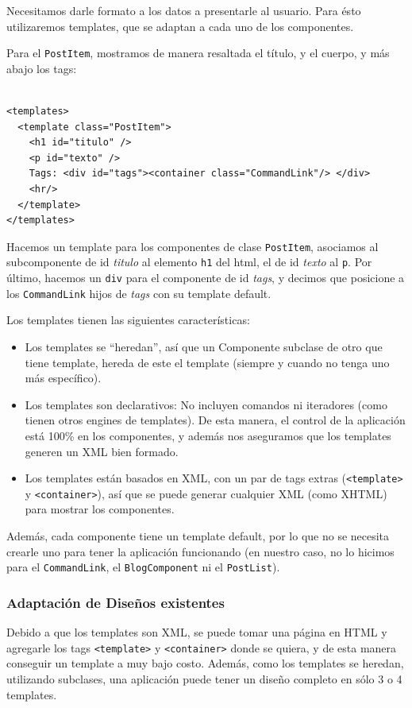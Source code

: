Necesitamos darle formato a los datos a presentarle al usuario. Para ésto utilizaremos templates, que se adaptan a cada uno de los componentes.

Para el \verb'PostItem', mostramos de manera resaltada el título, y el cuerpo, y más abajo los tags:

\begin{verbatim}

<templates>
  <template class="PostItem">
    <h1 id="titulo" />
    <p id="texto" />
    Tags: <div id="tags"><container class="CommandLink"/> </div>
    <hr/>
  </template>
</templates>

\end{verbatim}

Hacemos un template para los componentes de clase \verb'PostItem', asociamos al subcomponente de id \emph{titulo} al elemento \verb'h1' del html, el de id \emph{texto} al \verb'p'. Por último, hacemos un \verb'div' para el componente de id \emph{tags}, y decimos que posicione a los \verb'CommandLink' hijos de \emph{tags} con su template default.

Los templates tienen las siguientes características:
\begin{itemize}
\item Los templates se ``heredan'', así que un Componente subclase de otro que tiene template, hereda de este el template (siempre y cuando no tenga uno más específico).

\item Los templates son declarativos: No incluyen comandos ni iteradores (como tienen otros engines de templates). De esta manera, el control de la aplicación está 100\% en los componentes, y además nos aseguramos que los templates generen un XML bien formado.

\item Los templates están basados en XML, con un par de tags extras (\verb"<template>" y \verb"<container>"), así que se puede generar cualquier XML (como XHTML) para mostrar los componentes.
\end{itemize}

Además, cada componente tiene un template default, por lo que no se necesita crearle uno para tener la aplicación funcionando (en nuestro caso, no lo hicimos para el \verb'CommandLink', el \verb"BlogComponent" ni el \verb"PostList").

\subsubsection{Adaptación de Diseños existentes}
\label{sub-templates-adapt}
Debido a que los templates son XML, se puede tomar una página en HTML y agregarle los tags \verb"<template>" y \verb"<container>" donde se quiera, y de esta manera conseguir un template a muy bajo costo. Además, como los templates se heredan, utilizando
subclases, una aplicación puede tener un diseño completo en sólo 3 o 4 templates.

